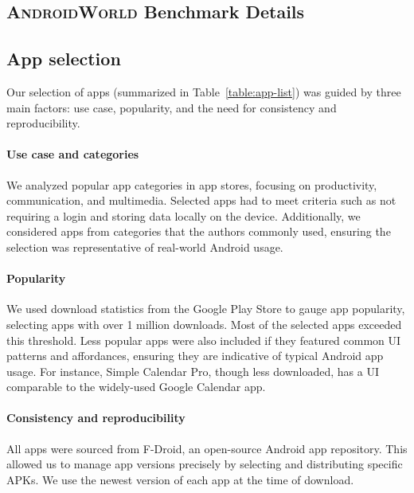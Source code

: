 \documentclass{article}
\newcommand{\system}{\textsc{AndroidWorld}\xspace}
\begin{document}
\begin{appendices}
\section{\system Benchmark Details}
\label{sec:benchmark_details}

\subsection{App selection}

Our selection of apps (summarized in Table~\ref{table:app-list}) was guided by three main factors: use case, popularity, and the need for consistency and reproducibility.

\paragraph{Use case and categories} We analyzed popular app categories in app stores, focusing on productivity, communication, and multimedia. Selected apps had to meet criteria such as not requiring a login and storing data locally on the device. Additionally, we considered apps from categories that the authors commonly used, ensuring the selection was representative of real-world Android usage.

\paragraph{Popularity} We used download statistics from the Google Play Store to gauge app popularity, selecting apps with over 1 million downloads. Most of the selected apps exceeded this threshold. Less popular apps were also included if they featured common UI patterns and affordances, ensuring they are indicative of typical Android app usage. For instance, Simple Calendar Pro, though less downloaded, has a UI comparable to the widely-used Google Calendar app.

\paragraph{Consistency and reproducibility} All apps were sourced from F-Droid, an open-source Android app repository. This allowed us to manage app versions precisely by selecting and distributing specific APKs. We use the newest version of each app at the time of download.

\begin{table}
\centering
\caption{List of \system apps and number of tasks for each one.}
\end{table}
\end{appendices}
\end{document}
